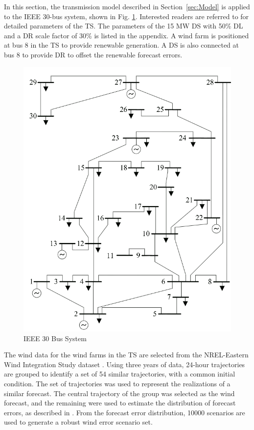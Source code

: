 In this section, the transmission model described in Section~\ref{sec:Model} is applied to the IEEE 30-bus system, shown in Fig.
\ref{fig:wee}. Interested readers are referred to \cite{zimmerman2009matpower} for
detailed parameters of the TS. The parameters of the 15 MW DS with 50\% DL and a DR scale factor of 30\% is listed in the appendix.  A wind farm is positioned at bus 8 in the TS to provide renewable generation. A DS is also connected at bus 8 to provide DR to offset the renewable forecast errors.
\begin{figure}[H]
\centering
\includegraphics[scale=0.4]{IEEE_30bus.png}
\caption{IEEE 30 Bus System}
\label{fig:wee}
\end{figure}

The wind data for the wind farms in the TS are selected from the
NREL-Eastern Wind Integration Study dataset \cite{energy2010eastern}.
Using three years of data, 24-hour trajectories are grouped
to identify a set of 54 similar trajectories, with a common initial
condition. The set of trajectories was used
to represent the realizations of a similar forecast. The central
trajectory of the group was selected as the wind forecast,
and the remaining were used to estimate the distribution of
forecast errors, as described in \cite{anderson2011wind}. From the forecast error
distribution, 10000 scenarios are used to generate a robust
wind error scenario set. 

